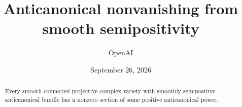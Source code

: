 \documentclass[11pt]{article}
\title{Anticanonical nonvanishing from smooth semipositivity}
\author{OpenAI}
\date{September 26, 2026}
\theoremstyle{remark}
\numberwithin{equation}{section}
\begin{document}
\maketitle
\begin{abstract}
Every smooth connected projective complex variety with smoothly
semipositive anticanonical bundle has a nonzero section of some positive
anticanonical power.
\end{abstract}
\tableofcontents









\end{document}
